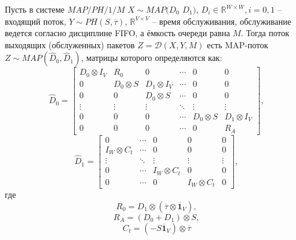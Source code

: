 \begin{thm}\label{th:ch4_departure_map}
  Пусть в системе $MAP/PH/1/M$ $X \sim MAP(D_{0}$ $D_{1})$, $D_i \in \mathbb{R}^{W \times W}, i=0,1$ -- входящий поток, $Y \sim PH(S, \overline{\tau})$, $\mathbb{R}^{V \times V}$ -- время обслуживания, обслуживание ведется согласно дисциплине FIFO, а ёмкость очереди равна $M$. Тогда поток выходящих (обслуженных) пакетов $Z = \mathcal{D}(X, Y, M)$ есть MAP-поток $Z \sim MAP(\hat{D}_{0},\hat{D}_{1})$, матрицы которого определяются как:
  \begin{equation}
	  \label{eq:ch4_map_ph1n_d0}
	  \hat{D}_{0} =
	  \begin{bmatrix}
  		D_{0} \otimes I_{V} & R_{0} & 0 & \cdots & 0 & 0\\
	  	0 & D_{0} \otimes S & D_{1} \otimes I_{V} & \cdots & 0 & 0\\
		  0 & 0 & D_{0} \otimes S & \cdots & 0 & 0 \\
		  \vdots & \vdots & \vdots & \ddots & \vdots & \vdots \\
  		0 & 0 & 0 & \cdots & D_{0} \otimes S & D_{1} \otimes I_{V}\\
	  	0 & 0 & 0 & \cdots & 0 & R_{A}
	  \end{bmatrix},
  \end{equation}
  \begin{equation}
	  \label{eq:ch4_map_ph1n_d1}
	  \hat{D}_{1} =
	    \begin{bmatrix}
		    0 & \cdots & 0 & 0 & 0 \\
		    I_{W} \otimes C_{t} & \cdots & 0 & 0 & 0 \\
		    \vdots & \ddots & \vdots & \vdots & \vdots \\
		    0 & \cdots & I_{W} \otimes C_{t} & 0 & 0\\
		    0 & \cdots & 0 & I_{W} \otimes C_{t} & 0
	    \end{bmatrix},
  \end{equation}
  где
  \begin{equation*}
	  R_{0} = D_{1}\otimes (\overline{\tau} \otimes \overline{\mathbf{1}}_{V}),
  \end{equation*}
  \begin{equation*}
	  R_{A} = (D_{0}+D_{1}) \otimes S,
  \end{equation*}
  \begin{equation*}
	  C_{t} = (-S \overline{\mathbf{1}}_{V}) \otimes \overline{\tau}
  \end{equation*}
\end{thm}

